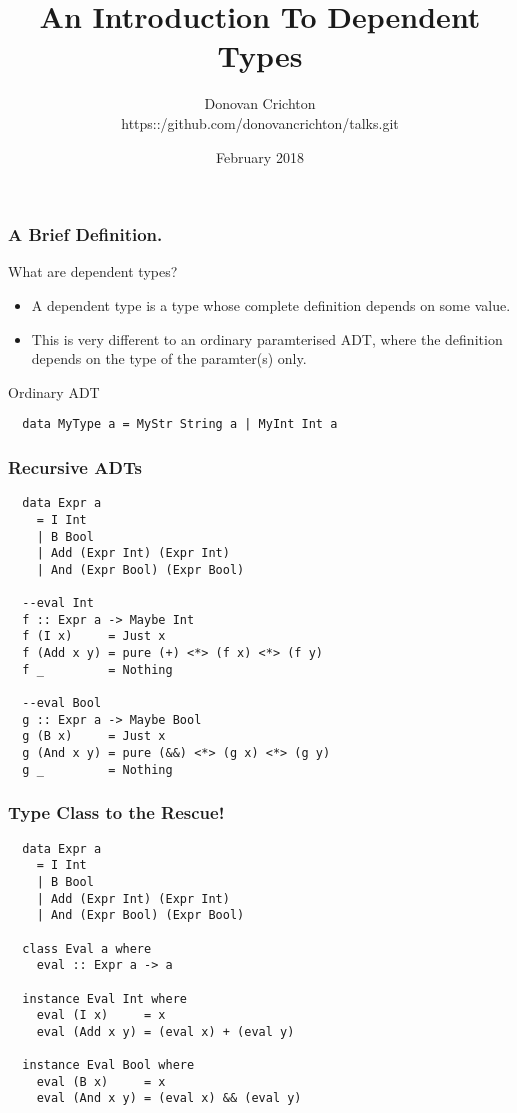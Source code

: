 \documentclass{beamer}
\title{An Introduction To Dependent Types}
\author{Donovan Crichton \\ https::/github.com/donovancrichton/talks.git}
\date{February 2018}
\begin{document}
 
\frame{\titlepage}

\begin{frame}[fragile]
  \frametitle{A Brief Definition.}

  \begin{block}{What are dependent types?}
  \begin{itemize}
    \item A dependent type is a type whose complete definition depends on
  some value. 

    \item This is very different to an ordinary paramterised ADT, where the
  definition depends on the \alert{type} of the paramter(s) only.
  \end{itemize}
  \end{block}
  \begin{block}{Ordinary ADT}
  \begin{minipage}{0.5\textwidth}
  \begin{verbatim}
  data MyType a = MyStr String a | MyInt Int a
  \end{verbatim}
  \end{minipage}
  \end{block}
\end{frame}

\begin{frame}[fragile]
\frametitle{Recursive ADTs}
  \begin{minipage}{1\textwidth}
  \begin{verbatim}
  data Expr a
    = I Int 
    | B Bool 
    | Add (Expr Int) (Expr Int) 
    | And (Expr Bool) (Expr Bool)

  --eval Int
  f :: Expr a -> Maybe Int
  f (I x)     = Just x
  f (Add x y) = pure (+) <*> (f x) <*> (f y)
  f _         = Nothing
 
  --eval Bool
  g :: Expr a -> Maybe Bool
  g (B x)     = Just x
  g (And x y) = pure (&&) <*> (g x) <*> (g y)
  g _         = Nothing
  \end{verbatim}
  \end{minipage}
\end{frame}

\begin{frame}[fragile]
\frametitle{Type Class to the Rescue!}
\begin{minipage}{1\textwidth}
\begin{verbatim}
  data Expr a
    = I Int 
    | B Bool 
    | Add (Expr Int) (Expr Int) 
    | And (Expr Bool) (Expr Bool)

  class Eval a where
    eval :: Expr a -> a

  instance Eval Int where
    eval (I x)     = x
    eval (Add x y) = (eval x) + (eval y)

  instance Eval Bool where
    eval (B x)     = x
    eval (And x y) = (eval x) && (eval y)
\end{verbatim}
\end{minipage}
\end{frame}
\end{document}

